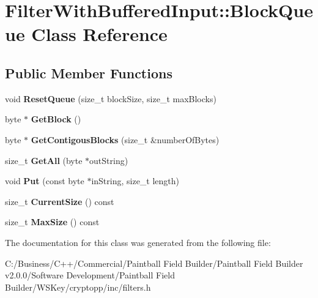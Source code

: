 \hypertarget{class_filter_with_buffered_input_1_1_block_queue}{
\section{FilterWithBufferedInput::BlockQueue Class Reference}
\label{class_filter_with_buffered_input_1_1_block_queue}
}
\subsection*{Public Member Functions}
\begin{DoxyCompactItemize}
\item 
\hypertarget{class_filter_with_buffered_input_1_1_block_queue_ae26b3245ce484f08d7938d9945a0072e}{
void {\bfseries ResetQueue} (size\_\-t blockSize, size\_\-t maxBlocks)}
\label{class_filter_with_buffered_input_1_1_block_queue_ae26b3245ce484f08d7938d9945a0072e}

\item 
\hypertarget{class_filter_with_buffered_input_1_1_block_queue_a0954ec7ab9f034364900ccec4a937f0e}{
byte $\ast$ {\bfseries GetBlock} ()}
\label{class_filter_with_buffered_input_1_1_block_queue_a0954ec7ab9f034364900ccec4a937f0e}

\item 
\hypertarget{class_filter_with_buffered_input_1_1_block_queue_a948c7cbeb03529e149c9a834af8b2dbd}{
byte $\ast$ {\bfseries GetContigousBlocks} (size\_\-t \&numberOfBytes)}
\label{class_filter_with_buffered_input_1_1_block_queue_a948c7cbeb03529e149c9a834af8b2dbd}

\item 
\hypertarget{class_filter_with_buffered_input_1_1_block_queue_a21ec4087d7accb0c7bd334d594bc6428}{
size\_\-t {\bfseries GetAll} (byte $\ast$outString)}
\label{class_filter_with_buffered_input_1_1_block_queue_a21ec4087d7accb0c7bd334d594bc6428}

\item 
\hypertarget{class_filter_with_buffered_input_1_1_block_queue_abe0f9fe6e9788f75607ac468421462ca}{
void {\bfseries Put} (const byte $\ast$inString, size\_\-t length)}
\label{class_filter_with_buffered_input_1_1_block_queue_abe0f9fe6e9788f75607ac468421462ca}

\item 
\hypertarget{class_filter_with_buffered_input_1_1_block_queue_ada052e97c655b6fdc162856d7790a2e1}{
size\_\-t {\bfseries CurrentSize} () const }
\label{class_filter_with_buffered_input_1_1_block_queue_ada052e97c655b6fdc162856d7790a2e1}

\item 
\hypertarget{class_filter_with_buffered_input_1_1_block_queue_a1baa69d304d1257a9f115ef020628c7d}{
size\_\-t {\bfseries MaxSize} () const }
\label{class_filter_with_buffered_input_1_1_block_queue_a1baa69d304d1257a9f115ef020628c7d}

\end{DoxyCompactItemize}


The documentation for this class was generated from the following file:\begin{DoxyCompactItemize}
\item 
C:/Business/C++/Commercial/Paintball Field Builder/Paintball Field Builder v2.0.0/Software Development/Paintball Field Builder/WSKey/cryptopp/inc/filters.h\end{DoxyCompactItemize}
